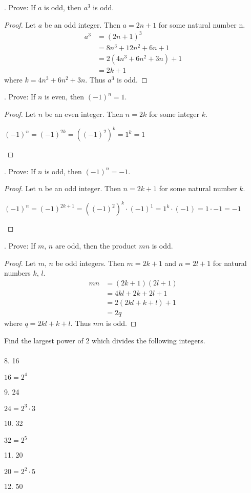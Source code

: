 \documentclass[12pt]{article}
\begin{document}
. Prove: If $a$ is odd, then $a^3$ is odd.
\begin{proof}
Let $a$ be an odd integer. Then $a=2n+1$ for some natural number n.
\begin{align*}
a^3&=(2n+1)^3 \\
&=8n^3+12n^2+6n+1 \\
&=2(4n^3+6n^2+3n)+1 \\
&=2k+1
\end{align*}
where $k=4n^3+6n^2+3n$. Thus $a^3$ is odd.
\end{proof}
. Prove: If $n$ is even, then $(-1)^n=1$.
\begin{proof}
Let $n$ be an even integer. Then $n=2k$ for some integer $k$.
\begin{center}
$(-1)^n=(-1)^{2k}=((-1)^2)^k=1^k=1$
\end{center}
\end{proof}
. Prove: If $n$ is odd, then $(-1)^n=-1$.
\begin{proof}
Let $n$ be an odd integer. Then $n=2k+1$ for some natural number $k$.
\begin{center}
$(-1)^n=(-1)^{2k+1}=((-1)^2)^k\cdot(-1)^1=1^k\cdot(-1)=1\cdot-1=-1$
\end{center}
\end{proof}
. Prove: If $m$, $n$ are odd, then the product $mn$ is odd.
\begin{proof}
Let $m$, $n$ be odd integers. Then $m=2k+1$ and $n=2l+1$ for natural numbers $k$, $l$.
\begin{align*}
mn&=(2k+1)(2l+1) \\
&=4kl+2k+2l+1 \\
&=2(2kl+k+l)+1 \\
&=2q
\end{align*}
where $q=2kl+k+l$. Thus $mn$ is odd.
\end{proof}
\noindent Find the largest power of 2 which divides the following integers. \\
\\
8. 16
\begin{center}
$16=2^4$
\end{center}
9. 24
\begin{center}
$24=2^3\cdot3$
\end{center}
10. 32
\begin{center}
$32=2^5$
\end{center}
11. 20
\begin{center}
$20=2^2\cdot5$
\end{center}
12. 50
\end{document}
